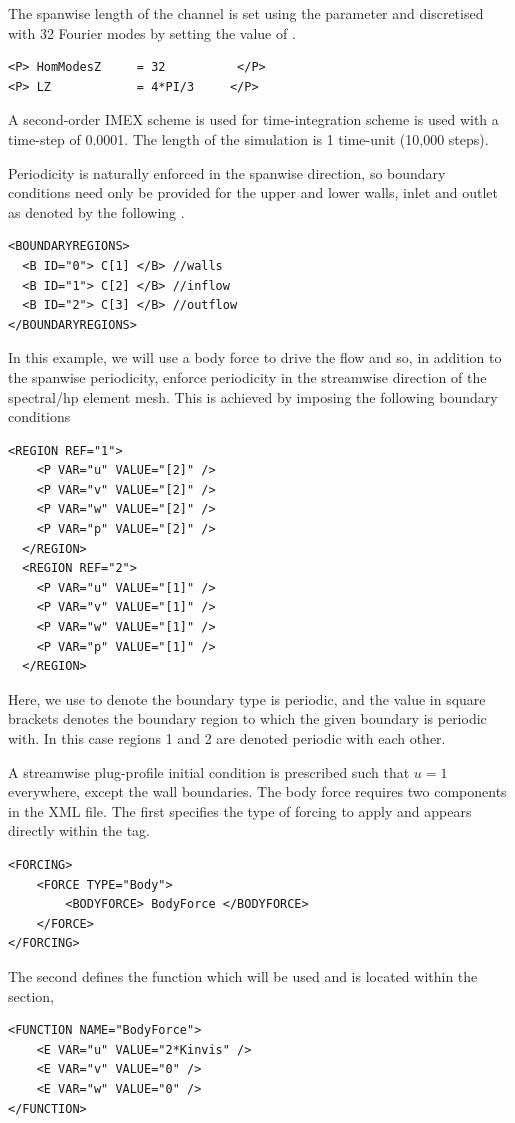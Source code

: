 The spanwise length of the channel is set using the  parameter and
discretised with 32 Fourier modes by setting the value of .
\begin{lstlisting}[style=XMLStyle]
<P> HomModesZ     = 32          </P>
<P> LZ            = 4*PI/3     </P>
\end{lstlisting}
A second-order IMEX scheme is used for time-integration scheme is used with a
time-step of 0.0001. The length of the simulation is 1 time-unit (10,000 steps).

Periodicity is naturally enforced in the spanwise direction, so boundary
conditions need only be provided for the upper and lower walls, inlet and
outlet as denoted by the following .
\begin{lstlisting}[style=XmlStyle]
<BOUNDARYREGIONS>
  <B ID="0"> C[1] </B> //walls
  <B ID="1"> C[2] </B> //inflow
  <B ID="2"> C[3] </B> //outflow
</BOUNDARYREGIONS>
\end{lstlisting}
In this example, we will use a body force to drive the flow and so, in addition
to the spanwise periodicity, enforce periodicity in the streamwise direction of
the spectral/hp element mesh. This is achieved by imposing the following
boundary conditions
\begin{lstlisting}[style=XMLStyle]
  <REGION REF="1">
    <P VAR="u" VALUE="[2]" />
    <P VAR="v" VALUE="[2]" />
    <P VAR="w" VALUE="[2]" />
    <P VAR="p" VALUE="[2]" />
  </REGION>
  <REGION REF="2">
    <P VAR="u" VALUE="[1]" />
    <P VAR="v" VALUE="[1]" />
    <P VAR="w" VALUE="[1]" />
    <P VAR="p" VALUE="[1]" />
  </REGION>
\end{lstlisting}
Here, we use  to denote the boundary type is periodic, and the value in
square brackets denotes the boundary region to which the given boundary is
periodic with. In this case regions 1 and 2 are denoted periodic with each
other.

A streamwise plug-profile initial condition is prescribed such that $u=1$
everywhere, except the wall boundaries. The body force requires two components
in the XML file. The first specifies the type of forcing to apply and appears
directly within the  tag.
\begin{lstlisting}[style=XMLStyle]
<FORCING>
    <FORCE TYPE="Body">
        <BODYFORCE> BodyForce </BODYFORCE>
    </FORCE>
</FORCING>
\end{lstlisting}
The second defines the  function which will be used and is
located within the  section,
\begin{lstlisting}[style=XMLStyle]
<FUNCTION NAME="BodyForce">
    <E VAR="u" VALUE="2*Kinvis" />
    <E VAR="v" VALUE="0" />
    <E VAR="w" VALUE="0" />
</FUNCTION>
\end{lstlisting}

